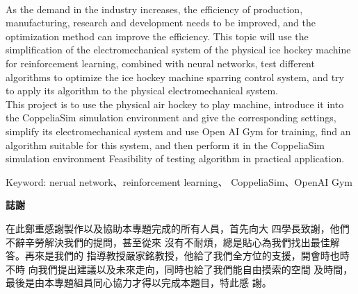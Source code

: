 \documentclass[14pt,a4paper]{report}  %
\begin{document}
\renewcommand{\baselinestretch}{1.5} %
\begin{center}
\LARGE\textbf{}\\
\begin{flushleft}
\fontsize{14pt}{16pt}\sectionef\hspace{12pt} As the demand in the industry increases, the efficiency of production, manufacturing, research and development needs to be improved, and the optimization method can improve the efficiency. This topic will use the simplification of the electromechanical system of the physical ice hockey machine for reinforcement learning, combined with neural networks, test different algorithms to optimize the ice hockey machine sparring control system, and try to apply its algorithm to the physical electromechanical system.\\[12pt]

\fontsize{14pt}{16pt}\sectionef\hspace{12pt} This project is to use the physical air hockey to play machine, introduce it into the CoppeliaSim simulation environment and give the corresponding settings, simplify its electromechanical system and use Open AI Gym for training, find an algorithm suitable for this system, and then perform it in the CoppeliaSim simulation environment Feasibility of testing algorithm in practical application.\\
\end{flushleft}
\begin{center}
\fontsize{14pt}{16pt}\selectfont\sectionef Keyword:  nerual network、reinforcement learning、 CoppeliaSim、OpenAI Gym
\end{center}
\newpage
\centerline\LARGE\textbf{誌謝}\\
\begin{flushleft}
\fontsize{14pt}{2.5pt}\hspace{12pt}在此鄭重感謝製作以及協助本專題完成的所有人員，首先向大
四學長致謝，他們不辭辛勞解決我們的提問，甚至從來
沒有不耐煩，總是貼心為我們找出最佳解答。再來是我們的
指導教授嚴家銘教授，他給了我們全方位的支援，開會時也時不時
向我們提出建議以及未來走向，同時也給了我們能自由摸索的空間
及時間，最後是由本專題組員同心協力才得以完成本題目，特此感
謝。
\end{flushleft}
\newpage
\renewcommand{\contentsname}{\centerline{\fontsize{18pt}{\baselineskip}\selectfont\textbf{目\quad 錄}}}
\tableofcontents　　%
\newpage
\renewcommand{\listfigurename}{\centerline{\fontsize{18pt}{\baselineskip}\selectfont\textbf{圖\quad 表\quad 目\quad 錄 }}}
\listoffigures
\newcommand{\captioname}{圖}
\newpage
\end{center}
\end{document}
